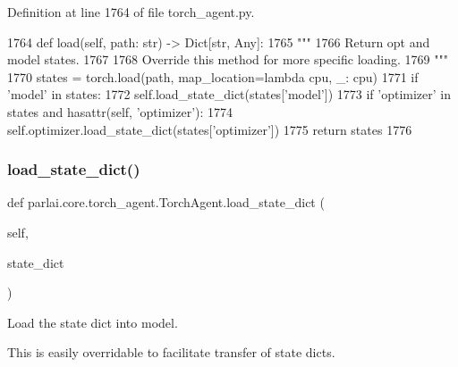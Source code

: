 Definition at line 1764 of file torch\+\_\+agent.\+py.


\begin{DoxyCode}
1764     \textcolor{keyword}{def }load(self, path: str) -> Dict[str, Any]:
1765         \textcolor{stringliteral}{"""}
1766 \textcolor{stringliteral}{        Return opt and model states.}
1767 \textcolor{stringliteral}{}
1768 \textcolor{stringliteral}{        Override this method for more specific loading.}
1769 \textcolor{stringliteral}{        """}
1770         states = torch.load(path, map\_location=\textcolor{keyword}{lambda} cpu, \_: cpu)
1771         \textcolor{keywordflow}{if} \textcolor{stringliteral}{'model'} \textcolor{keywordflow}{in} states:
1772             self.load\_state\_dict(states[\textcolor{stringliteral}{'model'}])
1773         \textcolor{keywordflow}{if} \textcolor{stringliteral}{'optimizer'} \textcolor{keywordflow}{in} states \textcolor{keywordflow}{and} hasattr(self, \textcolor{stringliteral}{'optimizer'}):
1774             self.optimizer.load\_state\_dict(states[\textcolor{stringliteral}{'optimizer'}])
1775         \textcolor{keywordflow}{return} states
1776 
\end{DoxyCode}
\mbox{\label{classparlai_1_1core_1_1torch__agent_1_1TorchAgent_a5dcfca62a677f8de97f09ce993258f84}} 
\subsubsection{\texorpdfstring{load\+\_\+state\+\_\+dict()}{load\_state\_dict()}}
{\footnotesize\ttfamily def parlai.\+core.\+torch\+\_\+agent.\+Torch\+Agent.\+load\+\_\+state\+\_\+dict (\begin{DoxyParamCaption}\item[{}]{self,  }\item[{}]{state\+\_\+dict }\end{DoxyParamCaption})}

\begin{DoxyVerb}Load the state dict into model.

This is easily overridable to facilitate transfer of state dicts.
\end{DoxyVerb}
 

